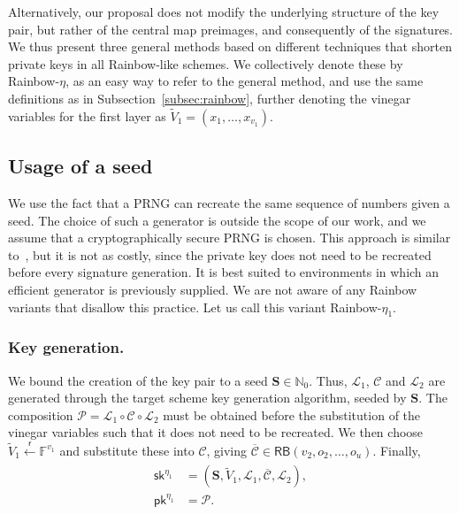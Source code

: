 \documentclass[12pt, a4paper, oneside]{memoir}
\newcommand{\random}{\overset{\mathsf{r}}{\gets}}
\theoremstyle{definition}
\begin{document}
Alternatively, our proposal does not modify the underlying structure of the key pair, but rather of the central map preimages, and consequently of the signatures. We thus present three general methods based on different techniques that shorten private keys in all Rainbow-like schemes. We collectively denote these by Rainbow-$\eta$, as an easy way to refer to the general method, and use the same definitions as in Subsection~\ref{subsec:rainbow}, further denoting the vinegar variables for the first layer as $\widetilde{V}_{1} = (x_{1}, \dots, x_{v_{1}})$.

\subsection{Usage of a seed}

We use the fact that a PRNG can recreate the same sequence of numbers given a seed. The choice of such a generator is outside the scope of our work, and we assume that a cryptographically secure PRNG is chosen. This approach is similar to~\cite{Shim:201512}, but it is not as costly, since the private key does not need to be recreated before every signature generation. It is best suited to environments in which an efficient generator is previously supplied. We are not aware of any Rainbow variants that disallow this practice. Let us call this variant Rainbow-$\eta_{1}$.

\subsubsection{Key generation.}

We bound the creation of the key pair to a seed $\mathbf{S} \in \mathbb{N}_{0}$. Thus, $\mathcal{L}_{1}$, $\mathcal{C}$ and $\mathcal{L}_{2}$ are generated through the target scheme key generation algorithm, seeded by $\mathbf{S}$. The composition $\mathcal{P} = \mathcal{L}_{1} \circ \mathcal{C} \circ \mathcal{L}_{2}$ must be obtained before the substitution of the vinegar variables such that it does not need to be recreated. We then choose $\widetilde{V}_{1} \random \mathbb{F}^{v_{1}}$ and substitute these into $\mathcal{C}$, giving $\overline{\mathcal{C}} \in \mathsf{RB}(v_{2}, o_{2}, \dots, o_{u})$. Finally,
\begin{align}
  \begin{split}
    \mathsf{sk}^{\eta_{1}} &= (\mathbf{S}, \widetilde{V}_{1}, \mathcal{L}_{1}, \overline{\mathcal{C}}, \mathcal{L}_{2}), \\
    \mathsf{pk}^{\eta_{1}} &= \mathcal{P}.
  \end{split}
\end{align}
\end{document}
